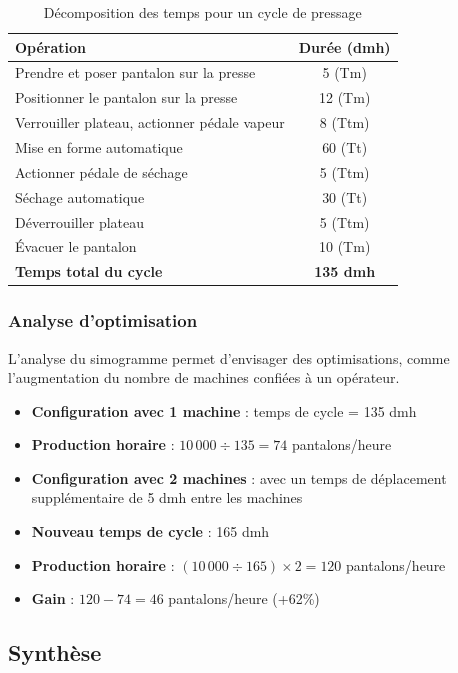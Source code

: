 \documentclass[a4paper,12pt]{article}
\begin{document}
\begin{table}[ht]
\centering
\begin{tabular}{|l|c|}
\hline
\textbf{Opération} & \textbf{Durée (dmh)} \\
\hline
Prendre et poser pantalon sur la presse & 5 (Tm) \\
Positionner le pantalon sur la presse & 12 (Tm) \\
Verrouiller plateau, actionner pédale vapeur & 8 (Ttm) \\
Mise en forme automatique & 60 (Tt) \\
Actionner pédale de séchage & 5 (Ttm) \\
Séchage automatique & 30 (Tt) \\
Déverrouiller plateau & 5 (Ttm) \\
Évacuer le pantalon & 10 (Tm) \\
\hline
\textbf{Temps total du cycle} & \textbf{135 dmh} \\
\hline
\end{tabular}
\caption{Décomposition des temps pour un cycle de pressage}
\end{table}

\subsubsection{Analyse d'optimisation}

L'analyse du simogramme permet d'envisager des optimisations, comme l'augmentation du nombre de machines confiées à un opérateur.

\begin{itemize}
    \item \textbf{Configuration avec 1 machine} : temps de cycle = 135 dmh
    \item \textbf{Production horaire} : $10\,000 \div 135 = 74$ pantalons/heure
    \item \textbf{Configuration avec 2 machines} : avec un temps de déplacement supplémentaire de 5 dmh entre les machines
    \item \textbf{Nouveau temps de cycle} : 165 dmh
    \item \textbf{Production horaire} : $(10\,000 \div 165) \times 2 = 120$ pantalons/heure
    \item \textbf{Gain} : $120 - 74 = 46$ pantalons/heure (+62\%)
\end{itemize}

\subsection{Synthèse}
\end{document}
